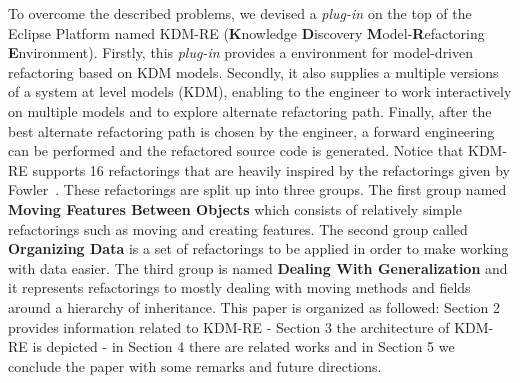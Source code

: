 To overcome the described problems, we devised a \textit{plug-in} on the top of the Eclipse Platform named KDM-RE (\textbf{K}nowledge \textbf{D}iscovery \textbf{M}odel-\textbf{R}efactoring \textbf{E}nvironment). Firstly, this \textit{plug-in} provides a environment for model-driven refactoring based on KDM models. Secondly, it also supplies a multiple versions of a system at level models (KDM), enabling to the engineer  to work interactively on multiple models and to explore alternate refactoring path. Finally, after the best alternate refactoring path is chosen by the engineer, a forward engineering can be performed and the refactored source code is generated. Notice that KDM-RE supports 16 refactorings that are heavily inspired by the refactorings given by Fowler~\cite{aqui}. These refactorings are split up into three groups. The first group named \textbf{Moving Features Between Objects} which consists of relatively simple refactorings such as moving and creating features. The second group called \textbf{Organizing Data} is a set of refactorings to be applied in order to make working with data easier. The third group is named \textbf{Dealing With Generalization} and it represents refactorings to mostly dealing with moving methods and fields around a hierarchy of inheritance. This paper is organized as followed: Section 2 provides information related to KDM-RE - Section 3 the architecture of KDM-RE is depicted - in Section 4 there are related works and in Section 5 we conclude the paper with some remarks and future directions.





